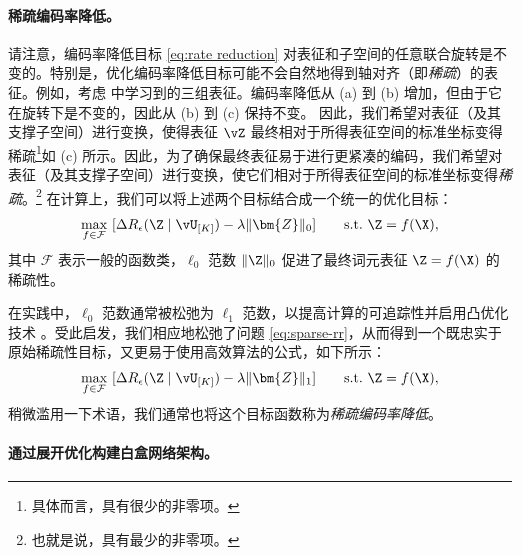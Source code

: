 \documentclass[../../book-main_zh.tex]{subfiles}
\begin{document}
\paragraph{稀疏编码率降低。} 请注意，编码率降低目标 \eqref{eq:rate reduction} 对表征和子空间的任意联合旋转是不变的。特别是，优化编码率降低目标可能不会自然地得到轴对齐（即\textit{稀疏}）的表征。{例如，考虑  中学习到的三组表征。编码率降低从 (a) 到 (b) 增加，但由于它在旋转下是不变的，因此从 (b) 到 (c) 保持不变。} 因此，我们希望对表征（及其支撑子空间）进行变换，使得表征 $\vZ$ 最终相对于所得表征空间的标准坐标变得稀疏\footnote{具体而言，具有很少的非零项。}{如 (c) 所示}。因此，为了确保最终表征易于进行更紧凑的编码，我们希望对表征（及其支撑子空间）进行变换，使它们相对于所得表征空间的标准坐标变得\textit{稀疏}。\footnote{也就是说，具有最少的非零项。}
在计算上，我们可以将上述两个目标结合成一个统一的优化目标：
\begin{equation}
    \max_{f \in \mathcal{F}}\ [\Delta R_{\epsilon}(\Z \mid \vU_{[K]})
    - \lambda \|\bm{Z}\|_0] \qquad \text{s.t.}\ \Z = f(\X),
    \label{eq:sparse-rr}
\end{equation}
其中 $\mathcal{F}$ 表示一般的函数类，$\ell_0$ 范数 $\|\Z\|_0$ 促进了最终词元表征 \(\Z = f(\X)\) 的稀疏性。%

在实践中，$\ell_0$ 范数通常被松弛为 $\ell_1$ 范数，以提高计算的可追踪性并启用凸优化技术 \cite{Wright-Ma-2022}。受此启发，我们相应地松弛了问题 \eqref{eq:sparse-rr}，从而得到一个既忠实于原始稀疏性目标，又更易于使用高效算法的公式，如下所示：
\begin{equation}
    \begin{aligned}
        \max_{f \in \mathcal{F}}\ [\Delta R_{\epsilon}(\Z \mid
        \vU_{[K]}) - \lambda \|\bm{Z}\|_1]  \qquad \text{s.t.}\ \Z = f(\X),
        \label{eq:sparse-rr-1}
    \end{aligned}
\end{equation}
稍微滥用一下术语，我们通常也将这个目标函数称为\textit{稀疏编码率降低}。

\paragraph{通过展开优化构建白盒网络架构。}
\end{document}
